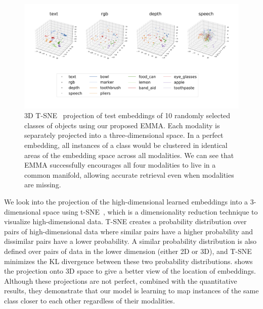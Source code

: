 \documentclass[10pt]{article} %
\newcommand{\ours}{\textsc{EMMA}}
\begin{document}
\begin{figure}[tbh]
\centering
\includegraphics[width=1\columnwidth]{Figures/3D-tsne-exp-supcon-emma-lard-64-relu-SGD-0.001-unique_objects-gold-no_neg_sampling-1024-sbs.png}
\caption{3D T-SNE~\cite{van2008tsne} projection of test embeddings of 10 randomly selected classes of objects using our proposed \ours{}. Each modality is separately projected into a three-dimensional space. In a perfect embedding, all instances of a class would be clustered in identical areas of the embedding space across all modalities. We can see that \ours{} successfully encourages all four modalities to live in a common manifold, allowing accurate retrieval even when modalities are missing. 
}
\label{fig:3d-tsne}
\end{figure}

We look into the projection of the high-dimensional learned embeddings into a 
3-dimensional space using t-SNE~\cite{van2008tsne}, which is a dimensionality reduction technique to visualize high-dimensional data. T-SNE creates a probability distribution over pairs of high-dimensional data where similar pairs have a higher probability and dissimilar pairs have a lower probability. A similar probability distribution is also defined over pairs of data in the lower dimension (either 2D or 3D), and T-SNE minimizes the KL divergence between these two probability distributions.
 shows the projection onto 3D space to give a better view of the location of embeddings. Although these projections are not perfect, combined with the quantitative results, they demonstrate that our model is learning to map instances of the same class closer to each other regardless of their modalities.
\end{document}
